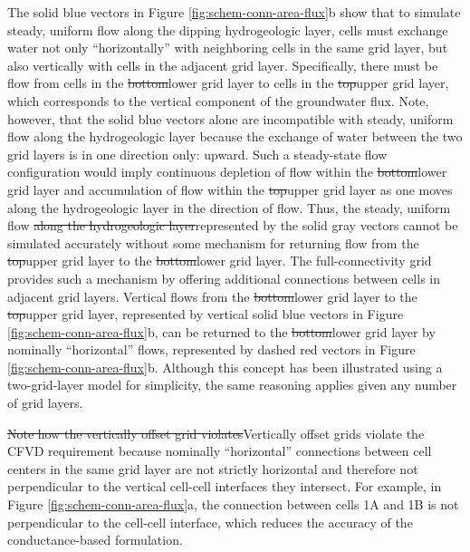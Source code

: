 \documentclass{article}
\begin{document}
The {\color{red}solid} blue vectors in Figure \ref{fig:schem-conn-area-flux}b show that to simulate steady, uniform flow along the dipping hydrogeologic layer, cells must exchange water not only ``horizontally'' with neighboring cells in the same grid layer, but also vertically with cells in the adjacent grid layer. Specifically, there must be flow from cells in the {\color{red} \sout{bottom}lower} grid layer to cells in the {\color{red} \sout{top}upper} grid layer, which corresponds to the vertical component of the groundwater flux. Note, however, that the {\color{red}solid} blue vectors alone are incompatible with steady, uniform flow along the hydrogeologic layer because the exchange of water between the two grid layers is in one direction only: upward. Such a steady-state flow configuration would imply continuous depletion of flow within the {\color{red} \sout{bottom}lower} grid layer and accumulation of flow within the {\color{red} \sout{top}upper} grid layer as one moves along the hydrogeologic layer in the direction of flow. Thus, {\color{red} the} steady, uniform flow {\color{red} \sout{along the hydrogeologic layer}represented by the {\color{red}solid} gray vectors} cannot be simulated accurately without some mechanism for returning flow from the {\color{red} \sout{top}upper} grid layer to the {\color{red} \sout{bottom}lower} grid layer. The full-connectivity grid provides such a mechanism by offering additional connections between cells in adjacent grid layers. Vertical flows from the {\color{red} \sout{bottom}lower} grid layer to the {\color{red} \sout{top}upper} grid layer, represented by vertical {\color{red}solid} blue vectors in Figure \ref{fig:schem-conn-area-flux}b, can be returned to the {\color{red} \sout{bottom}lower} grid layer by nominally ``horizontal'' flows, represented by {\color{red}dashed} red vectors in Figure \ref{fig:schem-conn-area-flux}b. Although this concept has been illustrated using a two-grid-layer model for simplicity, the same reasoning applies given any number of grid layers.

{\color{red} \sout{Note how the vertically offset grid violates}Vertically offset grids violate} the CFVD requirement because nominally ``horizontal'' connections between cell centers in the same grid layer are not strictly horizontal and therefore not perpendicular to the vertical cell-cell interfaces they intersect. For example, in Figure \ref{fig:schem-conn-area-flux}a, the connection between cells 1A and 1B is not perpendicular to the cell-cell interface, which reduces the accuracy of the conductance-based formulation.
\end{document}
